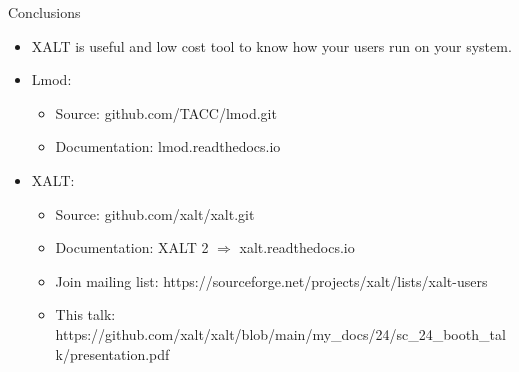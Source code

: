 \documentclass{beamer}
\begin{document}
\begin{frame}{Conclusions}
  \begin{itemize}
    \item XALT is useful and low cost tool to know how your users run
      on your system.
    \item Lmod:
      \begin{itemize}
        \item Source: github.com/TACC/lmod.git
        \item Documentation: lmod.readthedocs.io
      \end{itemize}
    \item XALT:
      \begin{itemize}
        \item Source: github.com/xalt/xalt.git
        \item Documentation: XALT 2 $\Rightarrow$ xalt.readthedocs.io
        \item Join mailing list: https://sourceforge.net/projects/xalt/lists/xalt-users
        \item This talk: https://github.com/xalt/xalt/blob/main/my\_docs/24/sc\_24\_booth\_talk/presentation.pdf
      \end{itemize}
  \end{itemize}
\end{frame}

%
\end{document}
